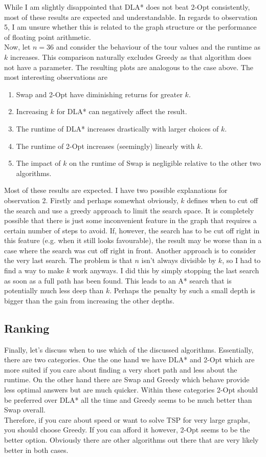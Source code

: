 \documentclass{article}
\begin{document}
While I am slightly disappointed that DLA* does not beat 2-Opt consistently,
most of these results are expected and understandable. In regards to observation
5, I am unsure whether this is related to the graph structure or the performance
of floating point arithmetic.\\
Now, let $n=36$ and consider the behaviour of the tour values and
the runtime as $k$ increases. This comparison naturally excludes Greedy as
that algorithm does not have a parameter. The resulting plots are
analogous to the case above. The most interesting observations are
\begin{enumerate}
    \item Swap and 2-Opt have diminishing returns for greater $k$.
    \item Increasing $k$ for DLA* can negatively affect the result.
    \item The runtime of DLA* increases drastically with larger choices of $k$.
    \item The runtime of 2-Opt increases (seemingly) linearly with $k$.
    \item The impact of $k$ on the runtime of Swap is negligible relative
    to the other two algorithms.
\end{enumerate}
Most of these results are expected. I have two possible explanations
for observation 2. Firstly and perhaps somewhat obviously, $k$ defines
when to cut off the search and use a greedy approach to limit the
search space. It is completely possible that there is just
some inconvenient feature in the graph that requires a certain number of
steps to avoid. If, however, the search has to be cut off right in
this feature (e.g. when it still looks favourable), the result may be 
worse than in a case where the search was cut off right in front.
Another approach is to consider the very last search. The problem is that
$n$ isn't always divisible by $k$, so I had to find a way to make $k$
work anyways. I did this by simply stopping the last search as soon
as a full path has been found. This leads to an A* search that
is potentially much less deep than $k$. Perhaps the penalty by such 
a small depth is bigger than the gain from increasing the other depths.



\subsection{Ranking}

Finally, let's discuss when to use which of the discussed algorithms. 
Essentially, there
are two categories. One the one hand we have DLA* and 2-Opt which are
more suited if you care about finding a very short path and less about
the runtime. On the other hand there are Swap and Greedy which behave
provide less optimal answers but are much quicker. Within these categories
2-Opt should be preferred over DLA* all the time and Greedy seems to be
much better than Swap overall.\\
Therefore, if you care about speed or want to solve TSP for very large
graphs, you should choose Greedy. If you can afford it however, 2-Opt
seems to be the better option. Obviously there are other algorithms
out there that are very likely better in both cases. 
\end{document}
